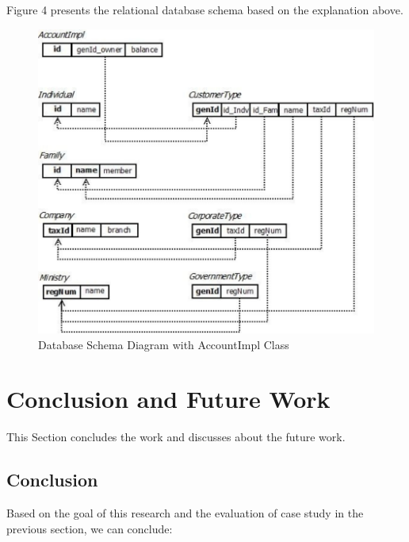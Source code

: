 \documentclass[conference]{IEEEtran}
\begin{document}
Figure 4 presents the relational database schema based on the explanation above.

\begin{figure}
	\centering
	\includegraphics[scale=0.5]{db2.pdf}
	\caption{Database Schema Diagram with AccountImpl Class}
	\label{figure4}
\end{figure}


\section{Conclusion and Future Work}
This Section concludes the work and discusses about the future work.

\subsection{Conclusion}
Based on the goal of this research and the evaluation of case study in the previous section, we can conclude:
\end{document}
